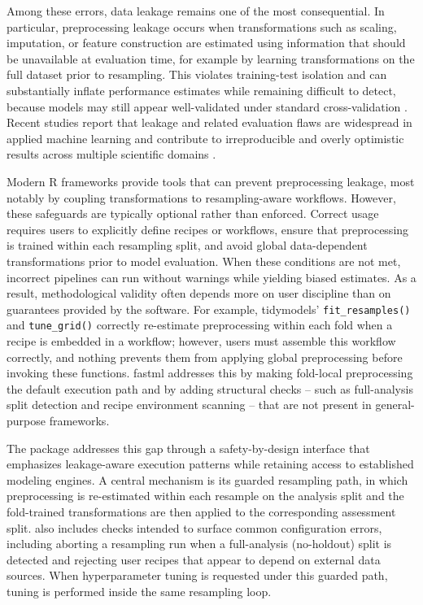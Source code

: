 Among these errors, data leakage remains one of the most consequential. In particular, preprocessing leakage occurs when transformations such as scaling, imputation, or feature construction are estimated using information that should be unavailable at evaluation time, for example by learning transformations on the full dataset prior to resampling. This violates training-test isolation and can substantially inflate performance estimates while remaining difficult to detect, because models may still appear well-validated under standard cross-validation \citep{Hastie:2009_ESL_book}. Recent studies report that leakage and related evaluation flaws are widespread in applied machine learning and contribute to irreproducible and overly optimistic results across multiple scientific domains \citep{Kapoor:2023aa, Rosenblatt:2024aa, Tampu:2022aa}.

Modern R frameworks provide tools that can prevent preprocessing leakage, most notably by coupling transformations to resampling-aware workflows. However, these safeguards are typically optional rather than enforced. Correct usage requires users to explicitly define recipes or workflows, ensure that preprocessing is trained within each resampling split, and avoid global data-dependent transformations prior to model evaluation. When these conditions are not met, incorrect pipelines can run without warnings while yielding biased estimates. As a result, methodological validity often depends more on user discipline than on guarantees provided by the software. For example, tidymodels' \texttt{fit\_resamples()} and \texttt{tune\_grid()} correctly re-estimate preprocessing within each fold when a recipe is embedded in a workflow; however, users must assemble this workflow correctly, and nothing prevents them from applying global preprocessing before invoking these functions. fastml addresses this by making fold-local preprocessing the default execution path and by adding structural checks -- such as full-analysis split detection and recipe environment scanning -- that are not present in general-purpose frameworks.

The  package \citep{Korkmaz:2025_fastml_Rpkg} addresses this gap through a safety-by-design interface that emphasizes leakage-aware execution patterns while retaining access to established modeling engines. A central mechanism is its guarded resampling path, in which preprocessing is re-estimated within each resample on the analysis split and the fold-trained transformations are then applied to the corresponding assessment split.  also includes checks intended to surface common configuration errors, including aborting a resampling run when a full-analysis (no-holdout) split is detected and rejecting user recipes that appear to depend on external data sources. When hyperparameter tuning is requested under this guarded path, tuning is performed inside the same resampling loop.

